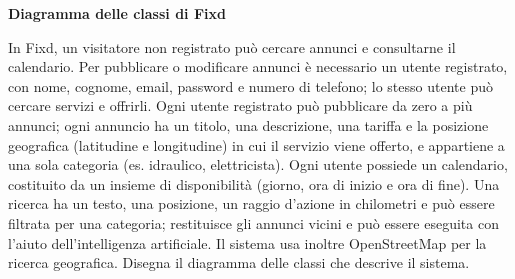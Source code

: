 \documentclass[a4paper,addpoints]{article}
\begin{document}
\begin{center}
  \Large\bfseries Diagramma delle classi di Fixd
\end{center}

In Fixd, un visitatore non registrato pu\`o cercare annunci e consultarne il calendario. Per pubblicare o modificare annunci \`e necessario un utente registrato, con nome, cognome, email, password e numero di telefono; lo stesso utente pu\`o cercare servizi e offrirli. Ogni utente registrato pu\`o pubblicare da zero a pi\`u annunci; ogni annuncio ha un titolo, una descrizione, una tariffa e la posizione geografica (latitudine e longitudine) in cui il servizio viene offerto, e appartiene a una sola categoria (es. idraulico, elettricista). Ogni utente possiede un calendario, costituito da un insieme di disponibilit\`a (giorno, ora di inizio e ora di fine). Una ricerca ha un testo, una posizione, un raggio d'azione in chilometri e pu\`o essere filtrata per una categoria; restituisce gli annunci vicini e pu\`o essere eseguita con l'aiuto dell'intelligenza artificiale. Il sistema usa inoltre OpenStreetMap per la ricerca geografica. Disegna il diagramma delle classi che descrive il sistema.
\end{document}
